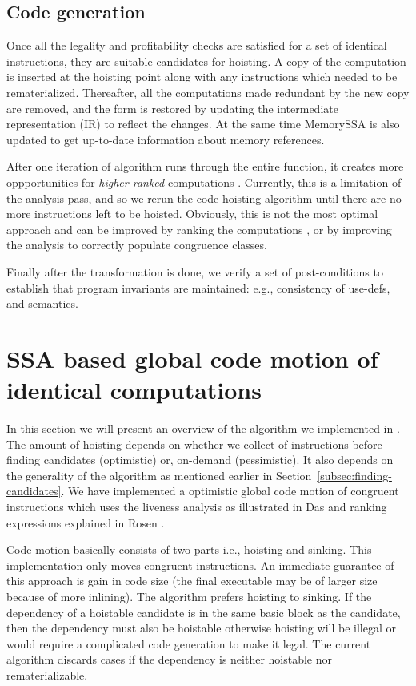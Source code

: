 \documentclass[acmlarge,review]{acmart}\settopmatter{printfolios=true}
\begin{document}
\subsection{Code generation}
Once all the legality and profitability checks are satisfied for a set of
identical instructions, they are suitable candidates for hoisting. A copy of the
computation is inserted at the hoisting point along with any instructions which
needed to be rematerialized. Thereafter, all the computations made redundant by
the new copy are removed, and the \SSA{} form is restored by updating the
intermediate representation (IR) to reflect the changes. At the same time
MemorySSA is also updated to get up-to-date information about memory references.

After one iteration of algorithm runs through the entire function, it creates
more oppportunities for \emph{higher ranked} computations
\cite{rosen1988global}. Currently, this is a limitation of the \GVN{} analysis
pass, and so we rerun the code-hoisting algorithm until there are no more
instructions left to be hoisted.  Obviously, this is not the most optimal
approach and can be improved by ranking the computations \cite{rosen1988global},
or by improving the \GVN{} analysis to correctly populate congruence classes.

Finally after the transformation is done, we verify a set of post-conditions to
establish that program invariants are maintained: e.g., consistency of use-defs,
and \SSA{} semantics.

\section{SSA based global code motion of identical computations}
\label{sec:implementation-details}
In this section we will present an overview of the algorithm we implemented in
\LLVM{}.  The amount of hoisting depends on whether we collect \GVN{} of
instructions before finding candidates (optimistic) or, on-demand
(pessimistic). It also depends on the generality of the \GVN{} algorithm as
mentioned earlier in Section~\ref{subsec:finding-candidates}. We have
implemented a optimistic global code motion of congruent instructions which uses
the liveness analysis as illustrated in Das \cite{das2012} and ranking
expressions explained in Rosen \cite{rosen1988global}.

Code-motion basically consists of two parts i.e., hoisting and sinking. This
implementation only moves congruent instructions. An immediate guarantee of this
approach is gain in code size (the final executable may be of larger size
because of more inlining). The algorithm prefers hoisting to sinking. If the
dependency of a hoistable candidate is in the same basic block as the candidate,
then the dependency must also be hoistable otherwise hoisting will be illegal or
would require a complicated code generation to make it legal. The current
algorithm discards cases if the dependency is neither hoistable nor
rematerializable.
\end{document}
